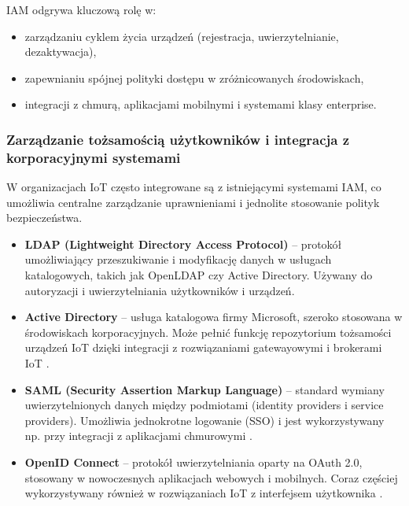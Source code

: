 IAM odgrywa kluczową rolę w:
\begin{itemize}
    \item zarządzaniu cyklem życia urządzeń (rejestracja, uwierzytelnianie, dezaktywacja),
    
    \item zapewnianiu spójnej polityki dostępu w zróżnicowanych środowiskach,
    
    \item integracji z chmurą, aplikacjami mobilnymi i systemami klasy enterprise.
\end{itemize}

\subsubsection*{Zarządzanie tożsamością użytkowników i integracja z korporacyjnymi systemami}

W organizacjach IoT często integrowane są z istniejącymi systemami IAM, co umożliwia centralne zarządzanie uprawnieniami i jednolite stosowanie polityk bezpieczeństwa.

\begin{itemize}
    \item \textbf{LDAP (Lightweight Directory Access Protocol)} – protokół umożliwiający przeszukiwanie i modyfikację danych w usługach katalogowych, takich jak OpenLDAP czy Active Directory. Używany do autoryzacji i uwierzytelniania użytkowników i urządzeń.
    
    \item \textbf{Active Directory} – usługa katalogowa firmy Microsoft, szeroko stosowana w środowiskach korporacyjnych. Może pełnić funkcję repozytorium tożsamości urządzeń IoT dzięki integracji z rozwiązaniami gatewayowymi i brokerami IoT \cite{microsoftIAMiot}.

    \item \textbf{SAML (Security Assertion Markup Language)} – standard wymiany uwierzytelnionych danych między podmiotami (identity providers i service providers). Umożliwia jednokrotne logowanie (SSO) i jest wykorzystywany np. przy integracji z aplikacjami chmurowymi \cite{microsoftSAML}.
    
    \item \textbf{OpenID Connect} – protokół uwierzytelniania oparty na OAuth 2.0, stosowany w nowoczesnych aplikacjach webowych i mobilnych. Coraz częściej wykorzystywany również w rozwiązaniach IoT z interfejsem użytkownika \cite{microsoftOIDC}.
\end{itemize}

